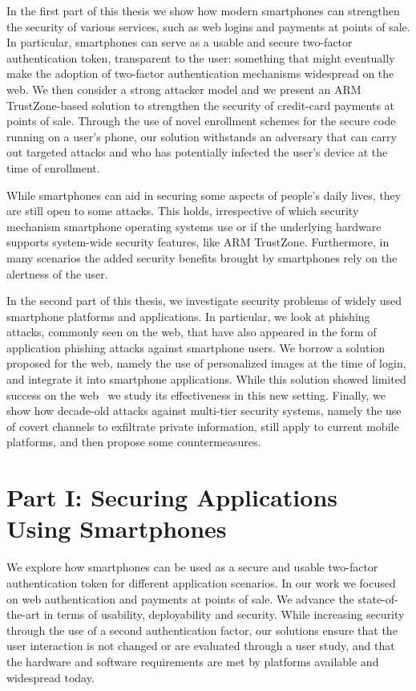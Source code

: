 In the first part of this thesis we show how modern smartphones can strengthen the security of various services, such as web logins and payments at points of sale. In particular, smartphones can serve as a usable and secure two-factor authentication token, transparent to the user: something that might eventually make the adoption of two-factor authentication mechanisms widespread on the web. We then consider a strong attacker model and we present an ARM TrustZone-based solution to strengthen the security of credit-card payments at points of sale. Through the use of novel enrollment schemes for the secure code running on a user's phone, our solution withstands an adversary that can carry out targeted attacks and who has potentially infected the user's device at the time of enrollment.

While smartphones can aid in securing some aspects of people's daily lives, they are still open to some attacks. This holds, irrespective of which security mechanism smartphone operating systems use or if the underlying hardware supports system-wide security features, like ARM TrustZone. Furthermore, in many scenarios the added security benefits brought by smartphones rely on the alertness of the user.

In the second part of this thesis, we investigate security problems of widely used smartphone platforms and applications. In particular, we look at phishing attacks, commonly seen on the web, that have also appeared in the form of application phishing attacks against smartphone users. We borrow a solution proposed for the web, namely the use of personalized images at the time of login, and integrate it into smartphone applications. While this solution showed limited success on the web~\cite{schechter07sp,lee-w2sp14} we study its effectiveness in this new setting. Finally, we show how decade-old attacks against multi-tier security systems, namely the use of covert channels to exfiltrate private information, still apply to current mobile platforms, and then propose some countermeasures.

\section{Part I: Securing Applications Using Smartphones}
\label{sec:intro_part1}

We explore how smartphones can be used as a secure and usable two-factor authentication token for different application scenarios. In our work we focused on web authentication and payments at points of sale. We advance the state-of-the-art in terms of usability, deployability and security. While increasing security through the use of a second authentication factor, our solutions ensure that the user interaction is not changed or are evaluated through a user study, and that the hardware and software requirements are met by platforms available and widespread today.

